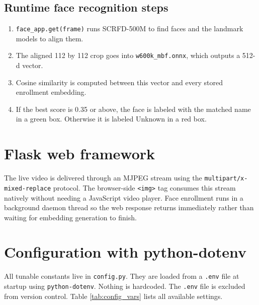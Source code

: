 \documentclass[12pt,a4paper]{report}
\begin{document}
\subsection{Runtime face recognition steps}

\begin{enumerate}
    \item \texttt{face\_app.get(frame)} runs SCRFD-500M to find faces and the landmark models to align them.
    \item The aligned 112 by 112 crop goes into \texttt{w600k\_mbf.onnx}, which outputs a 512-d vector.
    \item Cosine similarity is computed between this vector and every stored enrollment embedding.
    \item If the best score is 0.35 or above, the face is labeled with the matched name in a green box. Otherwise it is labeled Unknown in a red box.
\end{enumerate}

\section{Flask web framework}

The live video is delivered through an MJPEG stream using the \texttt{multipart/x-mixed-replace} protocol. The browser-side \texttt{<img>} tag consumes this stream natively without needing a JavaScript video player. Face enrollment runs in a background daemon thread so the web response returns immediately rather than waiting for embedding generation to finish.

\section{Configuration with python-dotenv}

All tunable constants live in \texttt{config.py}. They are loaded from a \texttt{.env} file at startup using \texttt{python-dotenv}. Nothing is hardcoded. The \texttt{.env} file is excluded from version control. Table \ref{tab:config_vars} lists all available settings.
\end{document}
